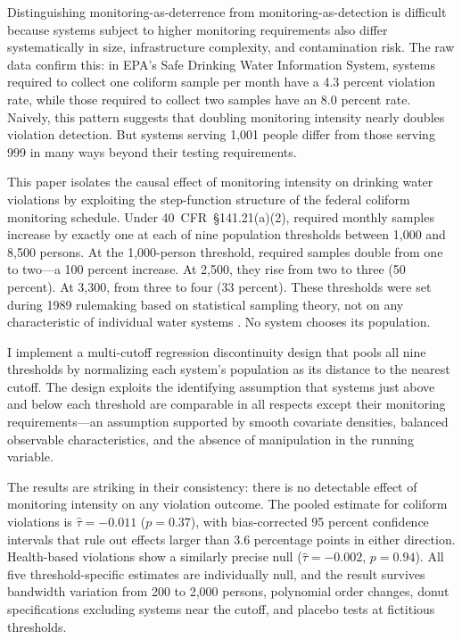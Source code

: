 \documentclass[12pt]{article}
\begin{document}
Distinguishing monitoring-as-deterrence from monitoring-as-detection is difficult because systems subject to higher monitoring requirements also differ systematically in size, infrastructure complexity, and contamination risk. The raw data confirm this: in EPA's Safe Drinking Water Information System, systems required to collect one coliform sample per month have a 4.3 percent violation rate, while those required to collect two samples have an 8.0 percent rate. Naively, this pattern suggests that doubling monitoring intensity nearly doubles violation detection. But systems serving 1,001 people differ from those serving 999 in many ways beyond their testing requirements.

This paper isolates the causal effect of monitoring intensity on drinking water violations by exploiting the step-function structure of the federal coliform monitoring schedule. Under 40~CFR~\S141.21(a)(2), required monthly samples increase by exactly one at each of nine population thresholds between 1,000 and 8,500 persons. At the 1,000-person threshold, required samples double from one to two---a 100 percent increase. At 2,500, they rise from two to three (50 percent). At 3,300, from three to four (33 percent). These thresholds were set during 1989 rulemaking based on statistical sampling theory, not on any characteristic of individual water systems \citep{cattaneo2020practical}. No system chooses its population.

I implement a multi-cutoff regression discontinuity design \citep{cattaneo2016interpreting, cattaneo2021extrapolating} that pools all nine thresholds by normalizing each system's population as its distance to the nearest cutoff. The design exploits the identifying assumption that systems just above and below each threshold are comparable in all respects except their monitoring requirements---an assumption supported by smooth covariate densities, balanced observable characteristics, and the absence of manipulation in the running variable.

The results are striking in their consistency: there is no detectable effect of monitoring intensity on any violation outcome. The pooled estimate for coliform violations is $\hat{\tau} = -0.011$ ($p = 0.37$), with bias-corrected 95 percent confidence intervals that rule out effects larger than 3.6 percentage points in either direction. Health-based violations show a similarly precise null ($\hat{\tau} = -0.002$, $p = 0.94$). All five threshold-specific estimates are individually null, and the result survives bandwidth variation from 200 to 2,000 persons, polynomial order changes, donut specifications excluding systems near the cutoff, and placebo tests at fictitious thresholds.
\end{document}
